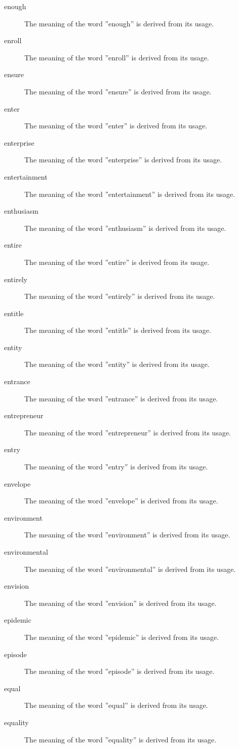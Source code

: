\documentclass[12pt, letterpaper]{memoir}
\begin{document}
\begin{description}
\item[enough] The meaning of the word ''enough'' is derived from its usage.
\item[enroll] The meaning of the word ''enroll'' is derived from its usage.
\item[ensure] The meaning of the word ''ensure'' is derived from its usage.
\item[enter] The meaning of the word ''enter'' is derived from its usage.
\item[enterprise] The meaning of the word ''enterprise'' is derived from its usage.
\item[entertainment] The meaning of the word ''entertainment'' is derived from its usage.
\item[enthusiasm] The meaning of the word ''enthusiasm'' is derived from its usage.
\item[entire] The meaning of the word ''entire'' is derived from its usage.
\item[entirely] The meaning of the word ''entirely'' is derived from its usage.
\item[entitle] The meaning of the word ''entitle'' is derived from its usage.
\item[entity] The meaning of the word ''entity'' is derived from its usage.
\item[entrance] The meaning of the word ''entrance'' is derived from its usage.
\item[entrepreneur] The meaning of the word ''entrepreneur'' is derived from its usage.
\item[entry] The meaning of the word ''entry'' is derived from its usage.
\item[envelope] The meaning of the word ''envelope'' is derived from its usage.
\item[environment] The meaning of the word ''environment'' is derived from its usage.
\item[environmental] The meaning of the word ''environmental'' is derived from its usage.
\item[envision] The meaning of the word ''envision'' is derived from its usage.
\item[epidemic] The meaning of the word ''epidemic'' is derived from its usage.
\item[episode] The meaning of the word ''episode'' is derived from its usage.
\item[equal] The meaning of the word ''equal'' is derived from its usage.
\item[equality] The meaning of the word ''equality'' is derived from its usage.

\end{description}
\end{document}
